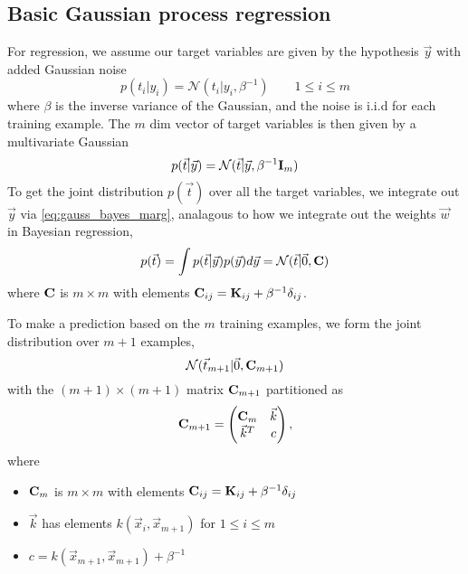 \documentclass[11pt]{article}
\begin{document}
\subsection{Basic Gaussian process regression}
For regression, we assume our target variables are given by the hypothesis $\vec y$ with
added Gaussian noise
\begin{equation}
  p(t_i | y_i) = \mathcal{N}(t_i | y_i, \beta^{-1}) \qquad 1 \leq i \leq m
\end{equation}
where $\beta$ is the inverse variance of the Gaussian, and the noise is i.i.d for each
training example. The $m$ dim vector of target variables is then given by a multivariate
Gaussian
\begin{equation}
  p(\vec t | \vec y) = \mathcal{N}(\vec t | \vec y, \beta^{-1} \mathbf{I}_m)
\end{equation}
To get the joint distribution $p(\vec t)$ over all the target variables, we integrate
out $\vec y$ via \ref{eq:gauss_bayes_marg}, analagous to how we integrate out the
weights $\vec w$ in Bayesian regression,
\begin{equation}
  p(\vec t) = \int p(\vec t | \vec y) p(\vec y) d\vec y =
  \mathcal{N}(\vec t | \vec 0, \mathbf{C})
\end{equation}
where $\mathbf{C}$ is $m \times m$ with elements
$\mathbf{C}_{ij} = \mathbf{K}_{ij} + \beta^{-1} \delta_{ij}$.

To make a prediction based on the $m$ training examples, we form the joint distribution
over $m+1$ examples,
\begin{equation}
  \mathcal{N}(\vec t_{m+1} | \vec 0, \mathbf{C}_{m+1})
\end{equation}
with the $(m+1) \times (m+1)$ matrix $\mathbf{C}_{m+1}$ partitioned as
\begin{equation}
  \mathbf{C}_{m+1} = 
  \left(
    \begin{matrix}
      \mathbf{C}_m & \vec k\\
      \vec k^T  & c
    \end{matrix}
  \right),
\end{equation}
where
\begin{itemize}
  \item $\mathbf{C}_m$ is $m \times m$ with elements $\mathbf{C}_{ij} = \mathbf{K}_{ij} +
  \beta^{-1} \delta_{ij}$
  \item $\vec k$ has elements $k(\vec x_i, \vec x_{m+1})$ for $1 \leq i \leq m$
  \item $c = k(\vec x_{m+1}, \vec x_{m+1}) + \beta^{-1}$
\end{itemize}
\end{document}
